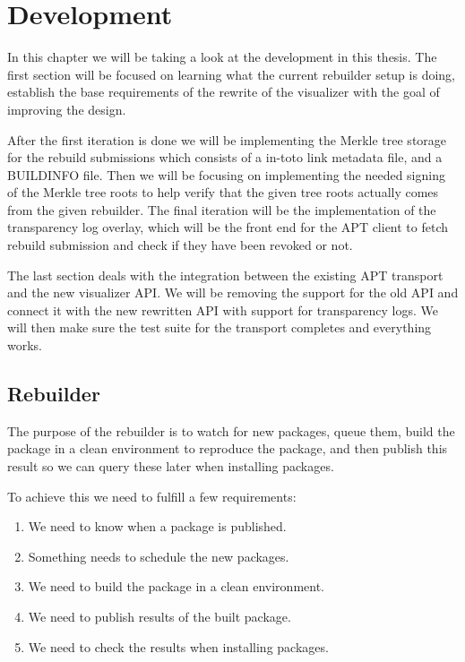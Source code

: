 \documentclass[../Main/thesis.tex]{subfiles}
\begin{document}
\chapter{Development}\label{ch:development}
In this chapter we will be taking a look at the development in this thesis. The
first section will be focused on learning what the current rebuilder setup is
doing, establish the base requirements of the rewrite of the visualizer with the
goal of improving the design.

After the first iteration is done we will be implementing the Merkle tree
storage for the rebuild submissions which consists of a in-toto link metadata
file, and a BUILDINFO file. Then we will be focusing on implementing the needed
signing of the Merkle tree roots to help verify that the given tree roots
actually comes from the given rebuilder. The final iteration will be the
implementation of the transparency log overlay, which will be the front end for
the APT client to fetch rebuild submission and check if they have been revoked
or not.

The last section deals with the integration between the existing APT transport
and the new visualizer API. We will be removing the support for the old API and
connect it with the new rewritten API with support for transparency logs. We
will then make sure the test suite for the transport completes and everything
works.

\section{Rebuilder}\label{sec:development_rebuilders}
The purpose of the rebuilder is to watch for new packages, queue them, build the
package in a clean environment to reproduce the package, and then publish this
result so we can query these later when installing packages.

To achieve this we need to fulfill a few requirements:

\begin{enumerate}
    \item \label{itm:published} We need to know when a package is published.
    \item \label{itm:scheduler} Something needs to schedule the new packages.
    \item \label{itm:builder} We need to build the package in a clean environment.
    \item \label{itm:publish} We need to publish results of the built package.
    \item \label{itm:transport} We need to check the results when installing packages.
\end{enumerate}
\end{document}
